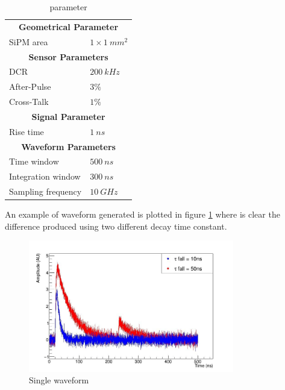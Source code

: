 \begin{table}
	\centering
	\setlength{\tabcolsep}{18pt}
	\begin{tabular}{ll}
		\toprule
		\multicolumn{2}{c}{\textbf{Geometrical Parameter}}	\\
		SiPM area	& $1 \times 1\ mm^2$	\\
		\midrule
		\multicolumn{2}{c}{\textbf{Sensor Parameters}}	\\
		DCR			& $200 \ kHz$	\\
		After-Pulse	& $3\% $	\\
		Cross-Talk	& $1\% $	\\
		\midrule
		\multicolumn{2}{c}{\textbf{Signal Parameter}}	\\
		Rise time	& $1\ ns$	\\
		\midrule
		\multicolumn{2}{c}{\textbf{Waveform Parameters}}	\\
		Time window	& $500 \ ns$	\\
		Integration window	& $300 \ ns$	\\
		Sampling frequency	& $10\ GHz$	\\
		\bottomrule
	\end{tabular}
	\caption{parameter}
	\label{tab:SiPM_par}
\end{table}

An example of waveform generated is plotted in figure \ref{fig:diff_wf} where is clear the difference produced using two different decay time constant.

\begin{figure}
	\centering
	\includegraphics[width=0.8\textwidth]{IMG/SingleWaveform}
	\caption{Single waveform}
	\label{fig:diff_wf}
\end{figure}

